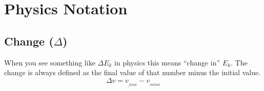 \documentclass[main.tex]{subfiles}
\begin{document}
        \section{Physics Notation}
            \label{sec: Physics Notation}

            \subsection{Change ($\Delta$)}
                \label{subsec: Delta Notation}

                When you see something like $\Delta E_k$ in physics this means ``change in'' $E_k$. 
                The change is always defined as the final value of that number minus the initial value.
                \begin{equation}
                    \Delta v = v_{_{final}} - v_{_{initial}}
                \end{equation}
\end{document}
